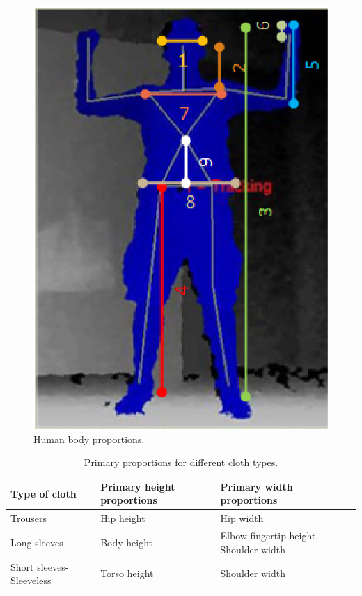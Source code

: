 \documentclass[number,preprint,review,12pt]{elsarticle}
\begin{document}
\begin{figure}
	\begin{center}
			\includegraphics[width=0.70\columnwidth]{body_proportions.eps}
	\end{center}
	\caption{Human body proportions.}
	\label{fig:body_proportions}
\end{figure}

\begin{table}
\center
{\color{red}
\begin{tabular}{ | p{3cm} | p{3.5cm} | p{3.5cm}  |}
\hline
\textbf{Type of cloth} & \textbf{Primary height proportions} & \textbf{Primary width proportions}  \\ \hline
Trousers & Hip height & Hip width \\ \hline
Long sleeves & Body height & Elbow-fingertip height, Shoulder width \\ \hline
Short sleeves-Sleeveless & Torso height & Shoulder width \\ 
\hline
\end{tabular}
}
\caption{Primary proportions for different cloth types.}
\label{tbl:primary_proportions}
\end{table}


\doublespacing
\end{document}

